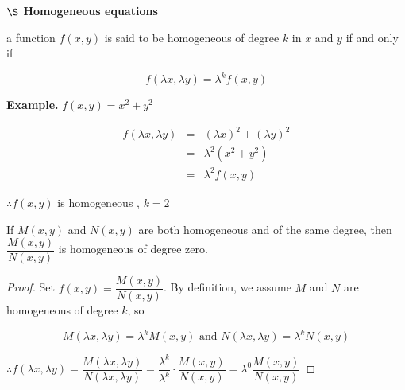 \textbf{$\S$ Homogeneous equations}

\begin{defn}
	a function $f(x,y)$ is said to be homogeneous of degree $k$ in $x$ and $y$ if and only if
	
	$$f(\lambda x,\lambda y) = \lambda^k f(x,y)$$
\end{defn}

\textbf{Example.} $f(x,y) = x^2 + y^2$

\begin{eqnarray*}
	f(\lambda x , \lambda y) &=& (\lambda x)^2 + (\lambda y)^2\\
	&=& \lambda^2 (x^2 + y^2)\\
	&=& \lambda^2 f(x,y)
\end{eqnarray*}

$\therefore f(x,y)$ is homogeneous  
, $k = 2$

\begin{thm*}
	If $M(x,y)$ and $N(x,y)$ are both homogeneous and of the same degree, then $\dfrac{M(x,y)}{N(x,y)}$ is homogeneous of degree zero.
\end{thm*}
\begin{proof}
	Set $f(x,y) = \dfrac{M(x,y)}{N(x,y)}$. By definition, we assume $M$ and $N$ are homogeneous of degree $k$, so
	
	$$M(\lambda x , \lambda y) = \lambda^k M(x,y) \text{ and } N(\lambda x,\lambda y) = \lambda^kN(x,y)$$
	
	$\therefore f(\lambda x,\lambda y) = \dfrac{M(\lambda x ,\lambda y )}{N(\lambda x, \lambda y)} = \dfrac{\lambda^k}{\lambda^k} \cdot \dfrac{M(x,y)}{N(x,y)} = \lambda^0 \dfrac{M(x,y)}{N(x,y)}$
\end{proof}












